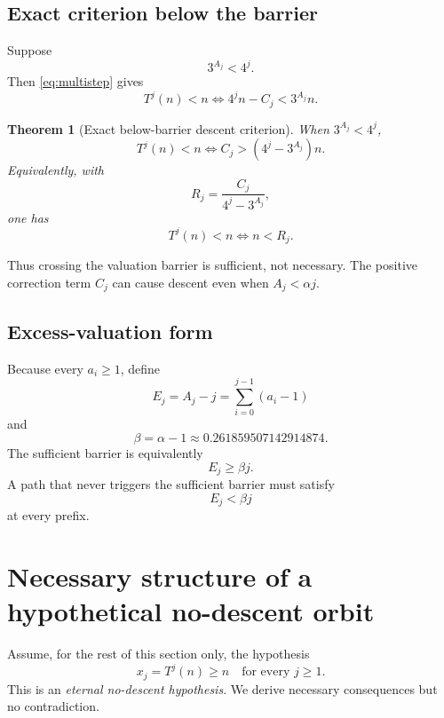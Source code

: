 \documentclass[11pt]{article}
\newtheorem{theorem}{Theorem}[section]
\theoremstyle{definition}
\theoremstyle{remark}
\begin{document}
\subsection{Exact criterion below the barrier}

Suppose
\[
3^{A_j}<4^j.
\]
Then \eqref{eq:multistep} gives
\[
T^j(n)<n
\iff
4^jn-C_j<3^{A_j}n.
\]

\begin{theorem}[Exact below-barrier descent criterion]
When $3^{A_j}<4^j$,
\begin{equation}
\boxed{
T^j(n)<n
\iff
C_j>(4^j-3^{A_j})n.
}
\label{eq:below-barrier}
\end{equation}
Equivalently, with
\begin{equation}
R_j=\frac{C_j}{4^j-3^{A_j}},
\label{eq:Rj}
\end{equation}
one has
\begin{equation}
\boxed{T^j(n)<n\iff n<R_j.}
\label{eq:Rcriterion}
\end{equation}
\end{theorem}

Thus crossing the valuation barrier is sufficient, not necessary.  The positive correction term $C_j$ can cause descent even when $A_j<\alpha j$.

\subsection{Excess-valuation form}

Because every $a_i\ge1$, define
\[
E_j=A_j-j=\sum_{i=0}^{j-1}(a_i-1)
\]
and
\[
\beta=\alpha-1\approx0.261859507142914874.
\]
The sufficient barrier is equivalently
\begin{equation}
E_j\ge\beta j.
\label{eq:excess-barrier}
\end{equation}
A path that never triggers the sufficient barrier must satisfy
\[
E_j<\beta j
\]
at every prefix.

\section{Necessary structure of a hypothetical no-descent orbit}

Assume, for the rest of this section only, the hypothesis
\begin{equation}
\boxed{x_j=T^j(n)\ge n\quad\text{for every }j\ge1.}
\tag{H}
\label{eq:H}
\end{equation}
This is an \emph{eternal no-descent hypothesis}.  We derive necessary consequences but no contradiction.
\end{document}
